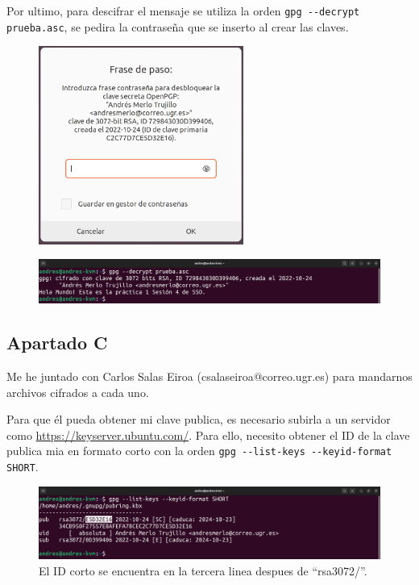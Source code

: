 \documentclass{article}
\begin{document}
Por ultimo, para descifrar el mensaje se utiliza la orden \verb|gpg --decrypt prueba.asc|, se pedira la contraseña que se inserto al crear las claves.

\begin{figure}[H]
    \centering
    \includegraphics[width=0.6\textwidth]{imagenes/Portatil/Captura desde 2022-10-24 12-17-29.png}
\end{figure}

\begin{figure}[H]
    \includegraphics[width=\textwidth]{imagenes/Portatil/Captura desde 2022-10-27 18-35-01.png}
\end{figure}


\subsection*{Apartado C}

Me he juntado con Carlos Salas Eiroa (csalaseiroa@correo.ugr.es) para mandarnos archivos cifrados a cada uno.

Para que él pueda obtener mi clave publica, es necesario subirla a un servidor como \url{https://keyserver.ubuntu.com/}. Para ello, necesito obtener el ID de la clave publica mia en formato corto con la orden \verb|gpg --list-keys --keyid-format SHORT|.


\begin{figure}[H]
    \includegraphics[width=\textwidth]{imagenes/Portatil/Captura desde 2022-10-24 11-54-58.png}
    \caption{El ID corto se encuentra en la tercera linea despues de ``rsa3072/''.}
\end{figure}
\end{document}
